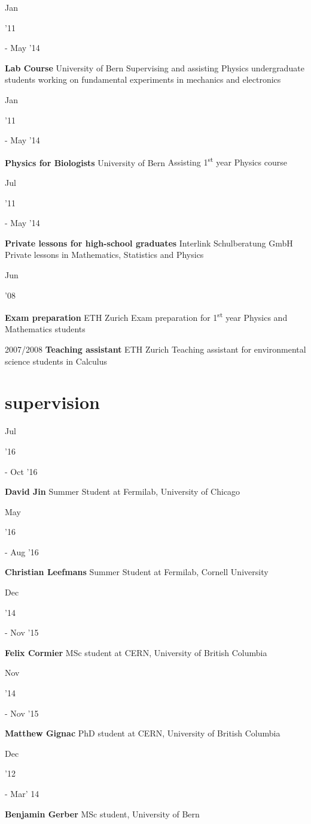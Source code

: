\documentclass[]{cv} %
\begin{document}
\begin{entrylist}

  \entry
  {\parbox[t]{\parboxWidthOne}{Jan}\parbox[t]{\parboxWidthTwo}{\hfill '11} - May '14}
  {\textbf{Lab Course}}
  {University of Bern}
  {Supervising and assisting Physics undergraduate students working on fundamental experiments in mechanics and electronics}

  \entry
  {\parbox[t]{\parboxWidthOne}{Jan}\parbox[t]{\parboxWidthTwo}{\hfill '11} - May '14}
  {\textbf{Physics for Biologists}}
  {University of Bern}
  {Assisting 1\textsuperscript{st} year Physics course}

  \entry
  {\parbox[t]{\parboxWidthOne}{Jul}\parbox[t]{\parboxWidthTwo}{\hfill '11} - May '14}
  {\textbf{Private lessons for high-school graduates}}
  {Interlink Schulberatung GmbH}
  {Private lessons in Mathematics, Statistics and Physics}

  \entry
  {\parbox[t]{\parboxWidthOne}{Jun}\parbox[t]{\parboxWidthTwo}{\hfill '08}}
  {\textbf{Exam preparation}}
  {ETH Zurich}
  {Exam preparation for 1\textsuperscript{st} year Physics and Mathematics students}

  \entry
  {2007/2008}
  {\textbf{Teaching assistant}}
  {ETH Zurich}
  {Teaching assistant for environmental science students in Calculus}

\end{entrylist}

\section{supervision}

\begin{entrylist}

  \entry
  {\parbox[t]{\parboxWidthOne}{Jul}\parbox[t]{\parboxWidthTwo}{\hfill '16} - Oct '16}
  {\textbf{David Jin}}
  {}
  {Summer Student at Fermilab, University of Chicago}

  \entry
  {\parbox[t]{\parboxWidthOne}{May}\parbox[t]{\parboxWidthTwo}{\hfill '16} - Aug '16}
  {\textbf{Christian Leefmans}}
  {}
  {Summer Student at Fermilab, Cornell University}

  \entry
  {\parbox[t]{\parboxWidthOne}{Dec}\parbox[t]{\parboxWidthTwo}{\hfill '14} - Nov '15}
  {\textbf{Felix Cormier}}
  {}
  {MSc student at CERN, University of British Columbia}

  \entry
  {\parbox[t]{\parboxWidthOne}{Nov}\parbox[t]{\parboxWidthTwo}{\hfill '14} - Nov '15}
  {\textbf{Matthew Gignac}}
  {}
  {PhD student at CERN, University of British Columbia}

  \entry
  {\parbox[t]{\parboxWidthOne}{Dec}\parbox[t]{\parboxWidthTwo}{\hfill '12} - Mar' 14}
  {\textbf{Benjamin Gerber}}
  {}
  {MSc student, University of Bern}

\end{entrylist}
\end{document}
